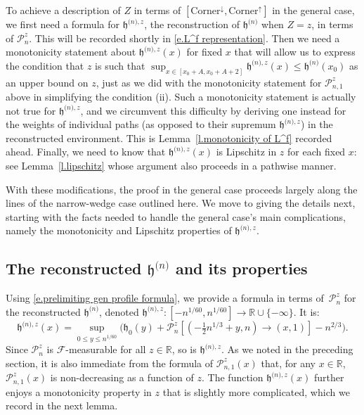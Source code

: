 \documentclass[oneside,final,11pt]{amsart}
\theoremstyle{definition}
\newcommand{\Corner}{\mathrm{Corner}}
\renewcommand{\L}{\CP}
\newcommand{\fh}{\mathfrak{h}}
\newcommand{\h}{\fh^{{\scriptscriptstyle(}n{\scriptscriptstyle)}}}
\newcommand{\hz}[1]{\fh^{{\scriptscriptstyle(}n{\scriptscriptstyle)},#1}}
\newcommand{\R}{\mathbb{R}}
\newcommand{\1}[1]{\mathbf{1}_{#1}}
\newcommand{\hlim}{\mathfrak{h}}
\newcommand{\F}{\mathscr{F}}
\newcommand{\CP}{\mathcal{P}}
\numberwithin{equation}{section}
\begin{document}
To achieve a description of $Z$ in terms of $[\Corner^{\downarrow}, \Corner^{\uparrow}]$ in the general case, we first need a formula for $\hz{z}$, the reconstruction of $\h$ when $Z=z$, in terms of $\L_n^z$. This will be recorded shortly in \eqref{e.L^f representation}. Then we need a monotonicity statement about $\hz{z}(x)$ for fixed $x$ that will allow us to express the condition that $z$ is such that $\sup_{x\in[x_0+A,x_0+A+2]} \hz{z}(x) \leq \h(x_0)$ as an upper bound on $z$, just as we did with the monotonicity statement for $\L_{n,1}^z$ above in simplifying the condition (ii). Such a monotonicity statement is actually not true for $\hz{z}$, and we circumvent this difficulty by deriving one instead for the weights of individual paths (as opposed to their supremum $\hz{z}$) in the reconstructed environment. This is Lemma~\ref{l.monotonicity of L^f} recorded ahead. Finally, we need to know that $\hz{z}(x)$ is Lipschitz in $z$ for each fixed $x$: see  Lemma~\ref{l.lipschitz} whose argument also proceeds in a pathwise manner.

With these modifications, the proof in the general case proceeds largely along the lines of the narrow-wedge case outlined here. We move to giving the details next, starting with the facts needed to handle the  general case's main complications, namely the monotonicity and Lipschitz properties of $\hz{z}$.

\subsection{The reconstructed $\h$ and its properties}
Using \eqref{e.prelimiting gen profile formula}, we provide a formula in terms of~$\L_n^z$ for the reconstructed $\h$, denoted $\hz{z}:[-n^{1/60}, n^{1/60}]\to\R\cup\{-\infty\}$. It is:
%
\begin{equation}\label{e.L^f representation}
\hz{z}(x) = \sup_{0\leq y\leq n^{1/60}} \Big(\hlim_0(y) + \L_n^{z}[(-\tfrac12n^{1/3}+ y, n) \to (x, 1)] - n^{2/3}\Big).
\end{equation}
%
%
Since $\L_n^{z}$ is $\F$-measurable for all $z\in \R$, so is $\hz{z}$. As we noted in the preceding section, it is also immediate from the formula of $\L_{n,1}^{z}(x)$ that, for any $x\in \R$, $\L_{n,1}^z(x)$ is non-decreasing as a function of $z$. The function $\hz{z}(x)$ further enjoys a monotonicity property in $z$ that is slightly more complicated, which we record in the next lemma.
\end{document}
